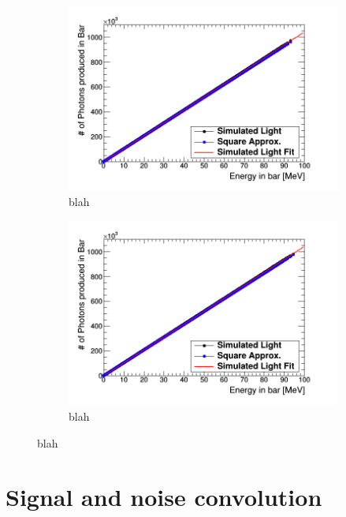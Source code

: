 \documentclass[12pt,a4paper]{article}
\begin{document}
\begin{figure}[H]
\centering
\begin{subfigure}{.5\textwidth}
  \centering
  \includegraphics[width=\linewidth]{light_of_electronsLin0-100mev.png}
  \captionsetup{width=.9\linewidth}
  \caption{blah}
  \label{a}
\end{subfigure}%
\begin{subfigure}{.5\textwidth}
  \centering
  \includegraphics[width=\linewidth]{light_of_positronsLin0-100mev.png}
  \captionsetup{width=.9\linewidth}
  \caption{blah}
  \label{b}
\end{subfigure}
\caption{blah}
\label{c}
\end{figure}

\section{Signal and noise convolution}
\end{document}
